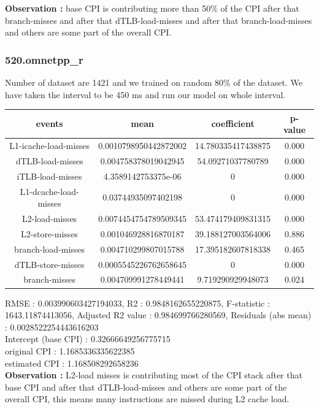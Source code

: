 \documentclass[10pt, letterpaper, IEEEtran, tikz,border=5,a4paper,fleqn]{article}
\begin{document}
\noindent \textbf{Observation :} base CPI is contributing more than 50\% of the CPI after that branch-misses and after that dTLB-load-misses and after that branch-load-misses and others are some part of the overall CPI.

\subsubsection{520.omnetpp\_r}

Number of dataset are 1421 and we trained on random 80\% of the dataset. We have taken the interval to be 450 ms and run our model on whole interval.
\begin{center}
\begin{tabular}{||c c c c||}
 \hline
 \textbf{events} & \textbf{mean} & \textbf{coefficient} & \textbf{p-value}\\ [0.5ex]
 \hline\hline
 L1-icache-load-misses & 0.0010798950442872002 & 14.780335417438875 & 0.000\\
 \hline
 dTLB-load-misses & 0.004758378019042945 & 54.09271037780789 & 0.000\\
 \hline
 iTLB-load-misses & 4.3589142753375e-06 & 0 & 0.000\\
 \hline
 L1-dcache-load-misses & 0.03744935097402198 & 0 & 0.000\\
 \hline
 L2-load-misses & 0.0074454754789509345 & 53.474179409831315 & 0.000\\
 \hline
 L2-store-misses & 0.001046928816870187 & 39.188127003564006 & 0.886\\
 \hline
 branch-load-misses & 0.004710299807015788 & 17.395182607818338 & 0.465\\
 \hline
 dTLB-store-misses & 0.0005545226762658645 & 0 & 0.000\\
 \hline
 branch-misses & 0.004709991278449441 & 9.719290929948073 & 0.024\\
 \hline
\end{tabular}
\end{center}
RMSE : 0.003990603427194033,
R2 : 0.9848162655220875,
F-statistic : 1643.11874413056,
Adjusted R2 value : 0.984699766280569,
Residuals (abs mean) : 0.0028522254443616203\\

\noindent Intercept (base CPI) : 0.32666649256775715\\
original CPI : 1.1685336335622385\\
estimated CPI : 1.168508292658236\\

\noindent \textbf{Observation :} L2-load misses is contributing most of the CPI stack after that base CPI and after that dTLB-load-misses and others are some part of the overall CPI, this means many instructions are missed during L2 cache load.
\end{document}
